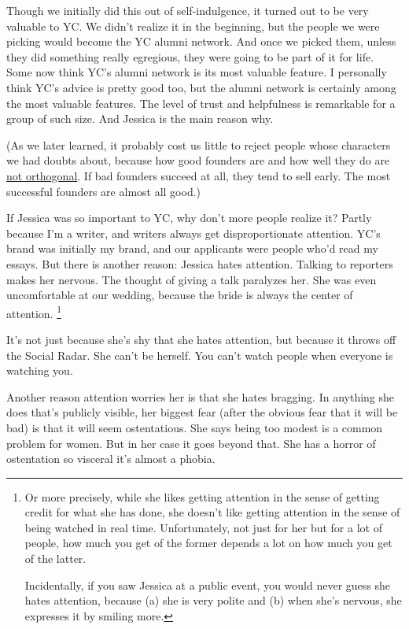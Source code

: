Though we initially did this out of self-indulgence, it turned out to be
very valuable to YC. We didn't realize it in the beginning, but the
people we were picking would become the YC alumni network. And once we
picked them, unless they did something really egregious, they were going
to be part of it for life. Some now think YC's alumni network is its
most valuable feature. I personally think YC's advice is pretty good
too, but the alumni network is certainly among the most valuable
features. The level of trust and helpfulness is remarkable for a group
of such size. And Jessica is the main reason why.

(As we later learned, it probably cost us little to reject people whose
characters we had doubts about, because how good founders are and how
well they do are \href{mean.html}{not orthogonal}. If bad founders
succeed at all, they tend to sell early. The most successful founders
are almost all good.)

If Jessica was so important to YC, why don't more people realize it?
Partly because I'm a writer, and writers always get disproportionate
attention. YC's brand was initially my brand, and our applicants were
people who'd read my essays. But there is another reason: Jessica hates
attention. Talking to reporters makes her nervous. The thought of giving
a talk paralyzes her. She was even uncomfortable at our wedding, because
the bride is always the center of attention. \footnote{Or more precisely, while she likes getting attention in the
sense of getting credit for what she has done, she doesn't like getting
attention in the sense of being watched in real time. Unfortunately, not
just for her but for a lot of people, how much you get of the former
depends a lot on how much you get of the latter.

Incidentally, if you saw Jessica at a public event, you would never
guess she hates attention, because (a) she is very polite and (b) when
she's nervous, she expresses it by smiling more.}

It's not just because she's shy that she hates attention, but because it
throws off the Social Radar. She can't be herself. You can't watch
people when everyone is watching you.

Another reason attention worries her is that she hates bragging. In
anything she does that's publicly visible, her biggest fear (after the
obvious fear that it will be bad) is that it will seem ostentatious. She
says being too modest is a common problem for women. But in her case it
goes beyond that. She has a horror of ostentation so visceral it's
almost a phobia.

